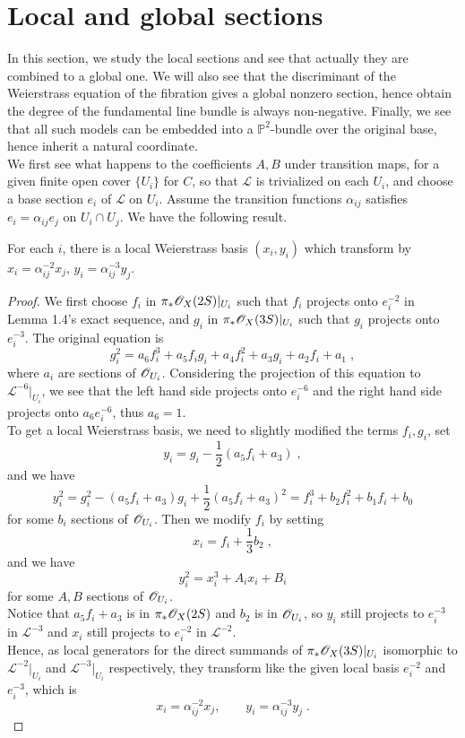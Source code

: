 \section{Local and global sections}
In this section, we study the local sections and see that actually they are combined to a global one. We will also see that the discriminant of the Weierstrass equation of the fibration gives a global nonzero section, hence obtain the degree of the fundamental line bundle is always non-negative. Finally, we see that all such models can be embedded into a $\mathbb{P}^2$-bundle over the original base, hence inherit a natural coordinate.\\ \indent
We first see what happens to the coefficients $A,B$ under transition maps, for a given finite open cover $\{U_i\}$ for $C$, so that $\mathcal{L}$ is trivialized on each $U_i$, and choose a base section $e_i$ of $\mathcal{L}$ on $U_i$. Assume the transition functions $\alpha_{ij}$ satisfies $e_i=\alpha_{ij}e_j$ on $U_i\cap U_j$. We have the following result.
\begin{lemm}
For each $i$, there is a local Weierstrass basis $(x_i,y_i)$ which transform by $x_i=\alpha_{ij}^{-2}x_j$, $y_i=\alpha_{ij}^{-3}y_j$.
\end{lemm}
\begin{proof}
We first choose $f_i$ in $\pi_*\mathscr{O}_X(2S)|_{U_i}$ such that $f_i$ projects onto $e_i^{-2}$ in Lemma 1.4's exact sequence, and $g_i$ in  $\pi_*\mathscr{O}_X(3S)|_{U_i}$ such that $g_i$ projects onto $e_i^{-3}$. The original equation  is
$$g_i^2=a_6f_i^3+a_5f_ig_i+a_4f_i^2+a_3g_i+a_2f_i+a_1\; ,$$
where $a_i$ are sections of $\mathscr{O}_{U_i}$.
Considering the projection of this equation to $\mathcal{L}^{-6}|_{U_i}$, we see that the left hand side projects onto $e_i^{-6}$ and the right hand side projects onto $a_6e_i^{-6}$, thus $a_6=1$.\\ \indent
To get a local Weierstrass basis, we need to slightly modified the terms $f_i,g_i$, set 
$$y_i=g_i-\frac{1}{2}\left(a_5f_i+a_3\right)\; ,$$
and we have
$$y_i^2=g_i^2-(a_5f_i+a_3)g_i+\frac{1}{2}\left(a_5f_i+a_3\right)^2=f_i^3+b_2f_i^2+b_1f_i+b_0$$
for some $b_i$ sections of $\mathscr{O}_{U_i}$. Then we modify $f_i$ by setting
$$x_i=f_i+\frac{1}{3}b_2\; ,$$
and we have
$$y_i^2=x_i^3+A_ix_i+B_i$$
for some $A,B$ sections of $\mathscr{O}_{U_i}$.\\ \indent
Notice that $a_5f_i+a_3$ is in $\pi_*\mathscr{O}_{X}(2S)$ and $b_2$ is in $\mathscr{O}_{U_i}$, so $y_i$ still projects to $e_i^{-3}$ in $\mathcal{L}^{-3}$ and $x_i$ still projects to $e_i^{-2}$ in $\mathcal{L}^{-2}$.\\
\indent Hence, as local generators for the direct summands of $\pi_*\mathscr{O}_X(3S)|_{U_i}$ isomorphic to $\mathcal{L}^{-2}|_{U_i}$ and $\mathcal{L}^{-3}|_{U_i}$ respectively, they transform like the given local basis $e_i^{-2}$ and $e_i^{-3}$, which is
$$x_i=\alpha_{ij}^{-2}x_j,\qquad y_i=\alpha_{ij}^{-3}y_j\; .$$
\end{proof}
